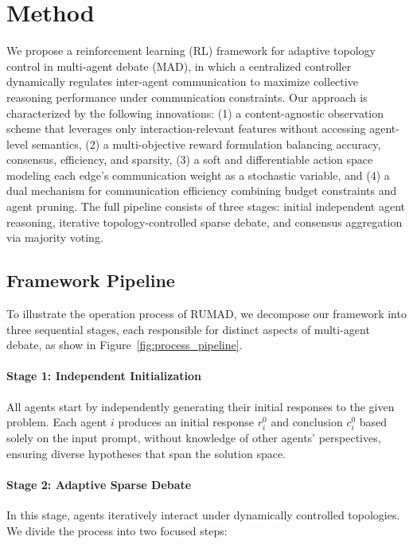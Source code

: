 \section{Method}


We propose a reinforcement learning (RL) framework for adaptive topology control in multi-agent debate (MAD), in which a centralized controller dynamically regulates inter-agent communication to maximize collective reasoning performance under communication constraints. Our approach is characterized by the following innovations: (1) a content-agnostic observation scheme that leverages only interaction-relevant features without accessing agent-level semantics, (2) a multi-objective reward formulation balancing accuracy, consensus, efficiency, and sparsity, (3) a soft and differentiable action space modeling each edge's communication weight as a stochastic variable, and (4) a dual mechanism for communication efficiency combining budget constraints and agent pruning. The full pipeline consists of three stages: initial independent agent reasoning, iterative topology-controlled sparse debate, and consensus aggregation via majority voting.
\subsection{Framework Pipeline}
\label{sec:framework_pipeline}
To illustrate the operation process of RUMAD, we decompose our framework into three sequential stages, each responsible for
distinct aspects of multi-agent debate, as show in Figure~\ref{fig:process_pipeline}. 


\paragraph{\textbf{Stage 1: Independent Initialization}}
All agents start by independently generating their initial responses to the given problem. Each agent $i$ produces an initial response $r_i^0$ and conclusion $c_i^0$ based solely on the input prompt, without knowledge of other agents’ perspectives, ensuring diverse hypotheses that span the solution space.

\paragraph{\textbf{Stage 2: Adaptive Sparse Debate}}
In this stage, agents iteratively interact under dynamically controlled topologies. We divide the process into two focused steps:

